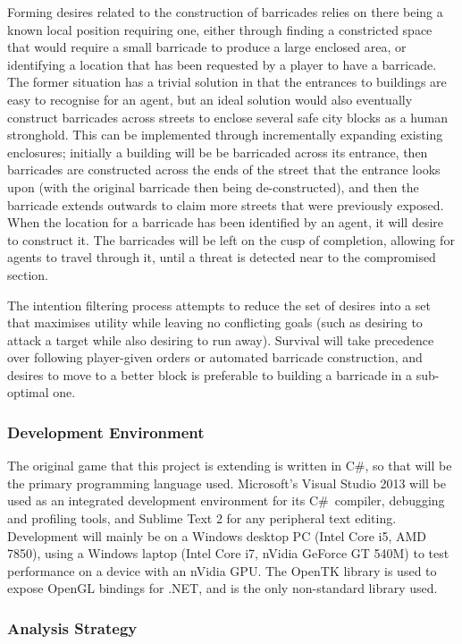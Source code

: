 \documentclass[12pt,a4paper]{article}
\newcommand{\Csh}{C{\lserif\#}}
\begin{document}
Forming desires related to the construction of barricades relies on there being a known local position requiring one, either through finding a constricted space that would require a small barricade to produce a large enclosed area, or identifying a location that has been requested by a player to have a barricade. The former situation has a trivial solution in that the entrances to buildings are easy to recognise for an agent, but an ideal solution would also eventually construct barricades across streets to enclose several safe city blocks as a human stronghold. This can be implemented through incrementally expanding existing enclosures; initially a building will be be barricaded across its entrance, then barricades are constructed across the ends of the street that the entrance looks upon (with the original barricade then being de-constructed), and then the barricade extends outwards to claim more streets that were previously exposed. When the location for a barricade has been identified by an agent, it will desire to construct it. The barricades will be left on the cusp of completion, allowing for agents to travel through it, until a threat is detected near to the compromised section.

The intention filtering process attempts to reduce the set of desires into a set that maximises utility while leaving no conflicting goals (such as desiring to attack a target while also desiring to run away). Survival will take precedence over following player-given orders or automated barricade construction, and desires to move to a better block is preferable to building a barricade in a sub-optimal one.


\subsubsection{Development Environment}\noindent
The original game that this project is extending is written in \Csh, so that will be the primary programming language used. Microsoft's Visual Studio 2013 will be used as an integrated development environment for its \Csh~compiler, debugging and profiling tools, and Sublime Text 2 for any peripheral text editing. Development will mainly be on a Windows desktop PC (Intel Core i5, AMD 7850), using a Windows laptop (Intel Core i7, nVidia GeForce GT 540M) to test performance on a device with an nVidia GPU. The OpenTK library is used to expose OpenGL bindings for .NET, and is the only non-standard library used.

\subsubsection{Analysis Strategy}

%
\end{document}

